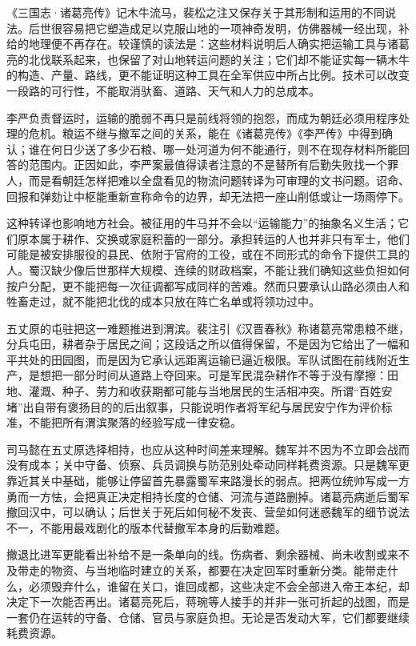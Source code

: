 《三国志·诸葛亮传》记木牛流马，裴松之注又保存关于其形制和运用的不同说法。后世很容易把它塑造成足以克服山地的一项神奇发明，仿佛器械一经出现，补给的地理便不再存在。较谨慎的读法是：这些材料说明后人确实把运输工具与诸葛亮的北伐联系起来，也保留了对山地转运问题的关注；它们却不能证实每一辆木牛的构造、产量、路线，更不能证明这种工具在全军供应中所占比例。技术可以改变一段路的可行性，不能取消驮畜、道路、天气和人力的总成本。

李严负责督运时，运输的脆弱不再只是前线将领的抱怨，而成为朝廷必须用程序处理的危机。粮运不继与撤军之间的关系，能在《诸葛亮传》《李严传》中得到确认；谁在何日少送了多少石粮、哪一处河道为何不能通行，则不在现存材料所能回答的范围内。正因如此，李严案最值得读者注意的不是替所有后勤失败找一个罪人，而是看朝廷怎样把难以全盘看见的物流问题转译为可审理的文书问题。诏命、回报和弹劾让中枢能重新宣称命令的边界，却无法把一座山削低或让一场雨停下。

这种转译也影响地方社会。被征用的牛马并不会以“运输能力”的抽象名义生活；它们原本属于耕作、交换或家庭积蓄的一部分。承担转运的人也并非只有军士，他们可能是被安排服役的县民、依附于官府的工役，或在不同形式的命令下提供工具的人。蜀汉缺少像后世那样大规模、连续的财政档案，不能让我们确知这些负担如何按户分配，更不能把每一次征调都写成同样的苦难。然而只要承认山路必须由人和牲畜走过，就不能把北伐的成本只放在阵亡名单或将领功过中。

五丈原的屯驻把这一难题推进到渭滨。裴注引《汉晋春秋》称诸葛亮常患粮不继，分兵屯田，耕者杂于居民之间；这段话之所以值得保留，不是因为它给出了一幅和平共处的田园图，而是因为它承认远距离运输已逼近极限。军队试图在前线附近生产，是想把一部分时间从道路上夺回来。可是军民混杂耕作不等于没有摩擦：田地、灌溉、种子、劳力和收获期都可能与当地居民的生活相冲突。所谓“百姓安堵”出自带有褒扬目的的后出叙事，只能说明作者将军纪与居民安宁作为评价标准，不能把所有渭滨聚落的经验写成一律安稳。

司马懿在五丈原选择相持，也应从这种时间差来理解。魏军并不因为不立即会战而没有成本；关中守备、侦察、兵员调换与防范别处牵动同样耗费资源。只是魏军更靠近其关中基础，能够让停留首先暴露蜀军来路漫长的弱点。把两位统帅写成一方勇而一方怯，会把真正决定相持长度的仓储、河流与道路删掉。诸葛亮病逝后蜀军撤回汉中，可以确认；后世关于死后如何秘不发丧、营垒如何迷惑魏军的细节说法不一，不能用最戏剧化的版本代替撤军本身的后勤难题。

撤退比进军更能看出补给不是一条单向的线。伤病者、剩余器械、尚未收割或来不及带走的物资、与当地临时建立的关系，都要在决定回军时重新分类。能带走什么，必须毁弃什么，谁留在关口，谁回成都，这些决定不会全部进入帝王本纪，却决定下一次能否再出。诸葛亮死后，蒋琬等人接手的并非一张可折起的战图，而是一套仍在运转的守备、仓储、官员与家庭负担。无论是否发动大军，它们都要继续耗费资源。

